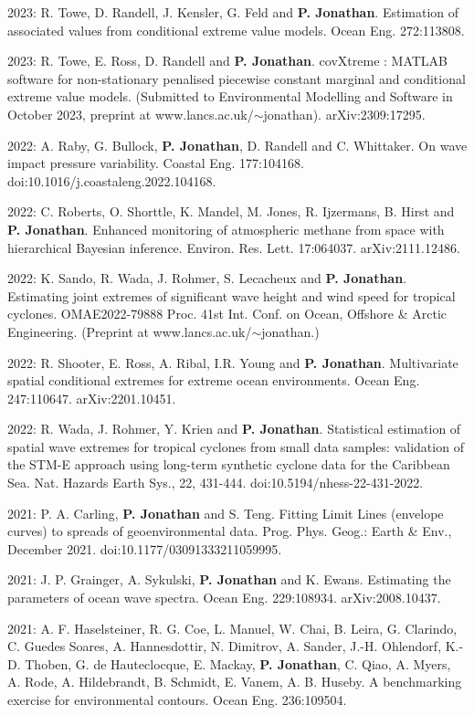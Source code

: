 \documentclass[11pt,a4paper]{moderncv}
\begin{document}
2023: R. Towe, D. Randell, J. Kensler, G. Feld and \textbf{P. Jonathan}. Estimation of associated values from conditional extreme value models. Ocean Eng. 272:113808.

2023: R. Towe, E. Ross, D. Randell and \textbf{P. Jonathan}. covXtreme : MATLAB software for non-stationary penalised piecewise constant marginal and conditional extreme value models. (Submitted to Environmental Modelling and Software in October 2023, preprint at www.lancs.ac.uk/$\sim$jonathan). arXiv:2309:17295.

2022: A. Raby, G. Bullock, \textbf{P. Jonathan}, D. Randell and C. Whittaker. On wave impact pressure variability. Coastal Eng. 177:104168. doi:10.1016/j.coastaleng.2022.104168.

2022: C. Roberts, O. Shorttle, K. Mandel, M. Jones, R. Ijzermans, B. Hirst and \textbf{P. Jonathan}. Enhanced monitoring of atmospheric methane from space with hierarchical Bayesian inference. Environ. Res. Lett. 17:064037. arXiv:2111.12486.

2022: K. Sando, R. Wada, J. Rohmer, S. Lecacheux and \textbf{P. Jonathan}. Estimating joint extremes of significant wave height and wind speed for tropical cyclones. OMAE2022-79888 Proc. 41st Int. Conf. on Ocean, Offshore \& Arctic Engineering. (Preprint at www.lancs.ac.uk/$\sim$jonathan.)

2022: R. Shooter, E. Ross, A. Ribal, I.R. Young and \textbf{P. Jonathan}. Multivariate spatial conditional extremes for extreme ocean environments. Ocean Eng. 247:110647. arXiv:2201.10451.

2022: R. Wada, J. Rohmer, Y. Krien and \textbf{P. Jonathan}. Statistical estimation of spatial wave extremes for tropical cyclones from small data samples: validation of the STM-E approach using long-term synthetic cyclone data for the Caribbean Sea. Nat. Hazards Earth Sys., 22, 431-444. doi:10.5194/nhess-22-431-2022.

2021: P. A. Carling, \textbf{P. Jonathan} and S. Teng. Fitting Limit Lines (envelope curves) to spreads of geoenvironmental data. Prog. Phys. Geog.: Earth \& Env., December 2021. doi:10.1177/03091333211059995.

2021: J. P. Grainger, A. Sykulski, \textbf{P. Jonathan} and K. Ewans. Estimating the parameters of ocean wave spectra. Ocean Eng. 229:108934. arXiv:2008.10437.

2021: A. F. Haselsteiner, R. G. Coe, L. Manuel, W. Chai, B. Leira, G. Clarindo, C. Guedes Soares, A. Hannesdottir, N. Dimitrov, A. Sander, J.-H. Ohlendorf, K.-D. Thoben, G. de Hauteclocque, E. Mackay, \textbf{P. Jonathan}, C. Qiao, A. Myers, A. Rode, A. Hildebrandt, B. Schmidt, E. Vanem, A. B. Huseby. A benchmarking exercise for environmental contours. Ocean Eng. 236:109504.
\end{document}
